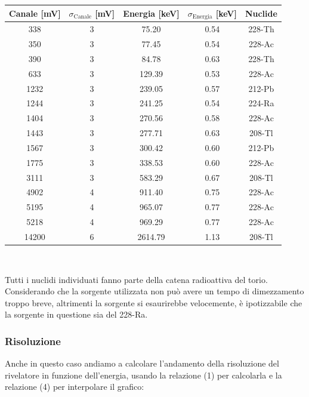 \documentclass[a4paper,10pt]{article}
\begin{document}
\begin{center}
    \begin{tabular}{c c c c c}
        \toprule
        Canale [mV] & $\sigma_{\textrm{Canale}}$ [mV] & Energia [keV] & $\sigma_{\textrm{Energia}}$ [keV] & Nuclide\\
        \midrule
	  338 & 3 & 75.20 & 0.54 & 228-Th\\
	  350 & 3 & 77.45 & 0.54 & 228-Ac\\
	  390 & 3 & 84.78 & 0.63 & 228-Th\\
	  633 & 3 & 129.39 & 0.53 & 228-Ac\\
	  1232 & 3 & 239.05 & 0.57 & 212-Pb\\
	  1244 & 3 & 241.25 & 0.54 & 224-Ra\\
	  1404 & 3 & 270.56 & 0.58 & 228-Ac\\
	  1443 & 3 & 277.71 & 0.63 & 208-Tl\\
	  1567 & 3 & 300.42 & 0.60 & 212-Pb\\
	  1775 & 3 & 338.53 & 0.60 & 228-Ac\\
	  3111 & 3 & 583.29 & 0.67 & 208-Tl\\
	  4902 & 4 & 911.40 & 0.75 & 228-Ac\\
	  5195 & 4 & 965.07 & 0.77 & 228-Ac\\
	  5218 & 4 & 969.29 & 0.77 & 228-Ac\\
	  14200 & 6 & 2614.79 & 1.13 & 208-Tl\\
        \bottomrule
    \end{tabular}\\
\end{center}

\noindent Tutti i nuclidi individuati fanno parte della catena radioattiva del torio. Considerando che la sorgente utilizzata non pu\`o avere un tempo di dimezzamento troppo breve, altrimenti la sorgente si esaurirebbe velocemente, \`e ipotizzabile che la sorgente in questione sia del 228-Ra.


\subsubsection{Risoluzione}

Anche in questo caso andiamo a calcolare l'andamento della risoluzione del rivelatore in funzione dell'energia, usando la relazione (1) per calcolarla e la relazione (4) per interpolare il grafico:
\end{document}
